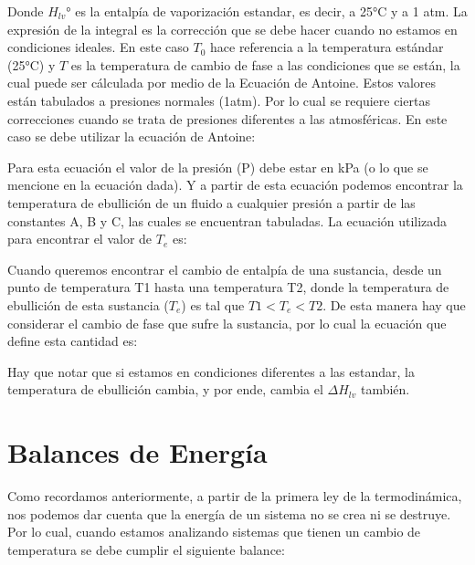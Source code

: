Donde $H_{lv}°$ es la entalpía de vaporización estandar, es decir, a 25°C y a 1 atm. La expresión de la integral es la corrección que se debe hacer cuando no estamos en condiciones ideales.
En este caso $T_0$ hace referencia a la temperatura estándar (25°C) y $T$ es la temperatura de cambio de fase a las condiciones que se están, la cual puede ser cálculada por medio de la Ecuación de Antoine.
Estos valores están tabulados a presiones normales (1atm). Por lo cual se requiere ciertas correcciones cuando se trata de presiones diferentes a las atmosféricas. 
En este caso se debe utilizar la ecuación de Antoine:


Para esta ecuación el valor de la presión (P) debe estar en kPa (o lo que se mencione en la ecuación dada). Y a partir de esta ecuación podemos encontrar la temperatura de ebullición de un fluido a cualquier presión a partir de las constantes A, B y C, las cuales se encuentran tabuladas.
La ecuación utilizada para encontrar el valor de $T_e$ es:


Cuando queremos encontrar el cambio de entalpía de una sustancia, desde un punto de temperatura T1 hasta una temperatura T2, donde la temperatura de ebullición de esta sustancia ($T_e$) es tal que $T1<T_e<T2$.
De esta manera hay que considerar el cambio de fase que sufre la sustancia, por lo cual la ecuación que define esta cantidad es:


Hay que notar que si estamos en condiciones diferentes a las estandar, la temperatura de ebullición cambia, y por ende, cambia el $\Delta H_{lv}$ también.

\section{Balances de Energía}

Como recordamos anteriormente, a partir de la primera ley de la termodinámica, nos podemos dar cuenta que la energía de un sistema no se crea ni se destruye. Por lo cual, cuando estamos analizando sistemas que tienen un cambio de temperatura se debe cumplir el siguiente balance:


